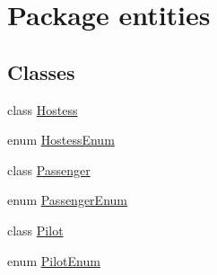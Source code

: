\hypertarget{namespaceentities}{}\section{Package entities}
\label{namespaceentities}
\subsection*{Classes}
\begin{DoxyCompactItemize}
\item 
class \hyperlink{classentities_1_1_hostess}{Hostess}
\item 
enum \hyperlink{enumentities_1_1_hostess_enum}{Hostess\+Enum}
\item 
class \hyperlink{classentities_1_1_passenger}{Passenger}
\item 
enum \hyperlink{enumentities_1_1_passenger_enum}{Passenger\+Enum}
\item 
class \hyperlink{classentities_1_1_pilot}{Pilot}
\item 
enum \hyperlink{enumentities_1_1_pilot_enum}{Pilot\+Enum}
\end{DoxyCompactItemize}
